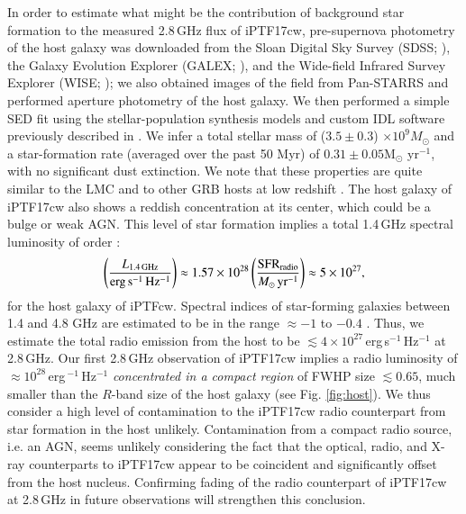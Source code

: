 \documentclass[twocolumn]{emulateapj}
\begin{document}
In order to estimate what might be the contribution of background star formation to the measured 2.8\,GHz flux of iPTF17cw, pre-supernova photometry of the host galaxy was downloaded from the Sloan Digital Sky Survey (SDSS; \citealt{SDSS}), the Galaxy Evolution Explorer (GALEX; \citealt{GALEX}), and the Wide-field Infrared Survey Explorer (WISE; \citealt{WISE}); we also obtained images of the field from Pan-STARRS \citep{PS1} and performed aperture photometry of the host galaxy.  We then performed a simple SED fit using the \cite{BC03} stellar-population synthesis models and custom IDL software previously described in \citet{Perley+2013}.  We infer a total stellar mass of ($3.5 \pm 0.3$) $\times 10^9 M_\odot$ and a star-formation rate (averaged over the past 50 Myr) of $0.31\pm 0.05 $M$_\odot$ yr$^{-1}$, with no significant dust extinction. We note that these properties are quite similar to the LMC and to other GRB hosts at low redshift \citep[e.g.,][and references therein]{Perley2016}. The host galaxy of iPTF17cw also shows a reddish concentration at its center, which could be a bulge or weak AGN. This level of star formation implies a total 1.4\,GHz spectral luminosity of order \citep{Murphy2011}:
\begin{equation}
\left(\frac{L_{\rm 1.4\,GHz}}{\rm erg\,s^{-1}\,Hz^{-1}}\right) \approx 1.57\times10^{28}\left(\frac{\rm SFR_{\rm radio}}{M_{\odot}\,\rm yr^{-1}}\right)\approx 5\times10^{27},
\end{equation}
for the host galaxy of iPTFcw. Spectral indices of star-forming galaxies between 1.4 and 4.8 GHz are estimated to be in the range $\approx -1$ to $-0.4$ \citep{Seymour2008}. Thus, we estimate the total radio emission from the host to be $\lesssim 4\times 10^{27}$\,erg\,s$^{-1}$\,Hz$^{-1}$ at 2.8\,GHz. Our first 2.8\,GHz observation of iPTF17cw implies a radio luminosity of $\approx 10^{28}$\,erg\,$^{-1}$\,Hz$^{-1}$ \textit{concentrated in a compact region} of FWHP size $\lesssim 0.65$\arcsec, much smaller than the $R$-band size of the host galaxy (see Fig. \ref{fig:host}).  We thus consider a high level of contamination to the iPTF17cw radio counterpart from star formation in the host unlikely.  Contamination from a compact radio source, i.e. an AGN, seems unlikely considering the fact that the optical, radio, and X-ray counterparts to iPTF17cw appear to be coincident and significantly offset from the host nucleus. Confirming fading of the radio counterpart of iPTF17cw at 2.8\,GHz in future observations will strengthen  this conclusion.
\end{document}
